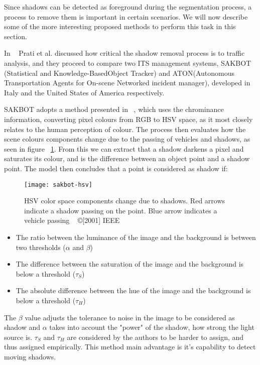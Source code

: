 Since shadows can be detected as foreground during the segmentation process, a process to remove them is important in certain scenarios. We will now describe some of the more interesting proposed methods to perform this task in this section.

In ~\cite{prati_shadow_2001} Prati et al. discussed how critical the shadow removal process is to traffic analysis, and they proceed to compare two ITS management systems, SAKBOT (Statistical and Knowledge-BasedObject Tracker) and ATON(Autonomous Transportation Agents for On-scene Networked incident manager), developed in Italy and the United States of America respectively.

SAKBOT adopts a method presented in ~\cite{cucchiara_statistic_2000}, which uses the chrominance information, converting pixel colours from RGB to HSV space, as it most closely relates to the human perception of colour. The process then evaluates how the scene colours components change due to the passing of vehicles and shadows, as seen in figure ~\ref{fig:sakbot-hsv}. From this we can extract that a shadow darkens a pixel and saturates its colour, and is the difference between an object point and a shadow point. The model then concludes that a point is considered as shadow if:

\begin{figure}[h]
  \begin{center}
    \leavevmode
    \texttt{[image: sakbot-hsv]}
    \captionsetup{justification=centering}
    \caption{HSV color space components change due to shadows. Red arrows indicate a shadow passing on the point. Blue arrow indicates a vehicle passing ~\cite{prati_shadow_2001} ©[2001] IEEE}
    \label{fig:sakbot-hsv}
  \end{center}
\end{figure}

\begin{itemize}
	\item The ratio between the luminance of the image and the background is between two thresholds ($\alpha$ and $\beta$)
	\item The difference between the saturation of the image and the background is below a threshold ($\tau_{S}$)
	\item The absolute difference between the hue of the image and the background is below a threshold ($\tau_{H}$)
\end{itemize}

The $\beta$ value adjusts the tolerance to noise in the image to be considered as shadow and $\alpha$ takes into account the "power" of the shadow, how strong the light source is. $\tau_{S}$ and $\tau_{H}$ are considered by the authors to be harder to assign, and thus assigned empirically. This method main advantage is it's capability to detect moving shadows.

